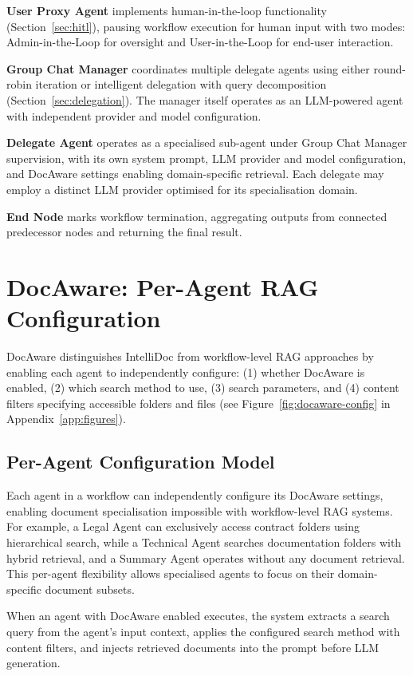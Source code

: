 \documentclass[11pt]{article}
\begin{document}
\textbf{User Proxy Agent} implements human-in-the-loop functionality (Section~\ref{sec:hitl}), pausing workflow execution for human input with two modes: Admin-in-the-Loop for oversight and User-in-the-Loop for end-user interaction.

\textbf{Group Chat Manager} coordinates multiple delegate agents using either round-robin iteration or intelligent delegation with query decomposition (Section~\ref{sec:delegation}). The manager itself operates as an LLM-powered agent with independent provider and model configuration.

\textbf{Delegate Agent} operates as a specialised sub-agent under Group Chat Manager supervision, with its own system prompt, LLM provider and model configuration, and DocAware settings enabling domain-specific retrieval. Each delegate may employ a distinct LLM provider optimised for its specialisation domain.

\textbf{End Node} marks workflow termination, aggregating outputs from connected predecessor nodes and returning the final result.


\section{DocAware: Per-Agent RAG Configuration}
\label{sec:docaware}

DocAware distinguishes IntelliDoc from workflow-level RAG approaches by enabling each agent to independently configure: (1) whether DocAware is enabled, (2) which search method to use, (3) search parameters, and (4) content filters specifying accessible folders and files (see Figure~\ref{fig:docaware-config} in Appendix~\ref{app:figures}).

\subsection{Per-Agent Configuration Model}

Each agent in a workflow can independently configure its DocAware settings, enabling document specialisation impossible with workflow-level RAG systems. For example, a Legal Agent can exclusively access contract folders using hierarchical search, while a Technical Agent searches documentation folders with hybrid retrieval, and a Summary Agent operates without any document retrieval. This per-agent flexibility allows specialised agents to focus on their domain-specific document subsets.

When an agent with DocAware enabled executes, the system extracts a search query from the agent's input context, applies the configured search method with content filters, and injects retrieved documents into the prompt before LLM generation.
\end{document}
